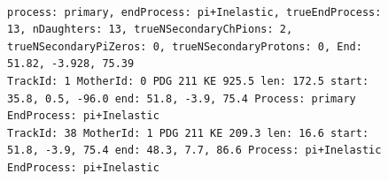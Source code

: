 \documentclass[letterpaper,12pt]{article}
\begin{document}
\begin{figure}[!hbtp]
  \begin{center}
\\
\begin{lstlisting}
process: primary, endProcess: pi+Inelastic, trueEndProcess: 13, nDaughters: 13, trueNSecondaryChPions: 2, trueNSecondaryPiZeros: 0, trueNSecondaryProtons: 0, End: 51.82, -3.928, 75.39
TrackId: 1 MotherId: 0 PDG 211 KE 925.5 len: 172.5 start: 35.8, 0.5, -96.0 end: 51.8, -3.9, 75.4 Process: primary EndProcess: pi+Inelastic
TrackId: 38 MotherId: 1 PDG 211 KE 209.3 len: 16.6 start: 51.8, -3.9, 75.4 end: 48.3, 7.7, 86.6 Process: pi+Inelastic EndProcess: pi+Inelastic

\end{lstlisting}
\end{center}
\end{figure}
\end{document}

